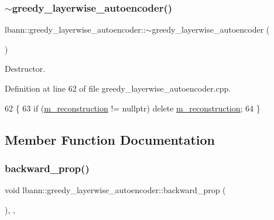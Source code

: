 \subsubsection{\texorpdfstring{$\sim$greedy\+\_\+layerwise\+\_\+autoencoder()}{~greedy\_layerwise\_autoencoder()}}
{\footnotesize\ttfamily lbann\+::greedy\+\_\+layerwise\+\_\+autoencoder\+::$\sim$greedy\+\_\+layerwise\+\_\+autoencoder (\begin{DoxyParamCaption}{ }\end{DoxyParamCaption})\hspace{0.3cm}{\ttfamily [override]}}

Destructor. 

Definition at line 62 of file greedy\+\_\+layerwise\+\_\+autoencoder.\+cpp.


\begin{DoxyCode}
62                                                             \{
63   \textcolor{keywordflow}{if} (\hyperlink{classlbann_1_1greedy__layerwise__autoencoder_a8238d2e3e723543c8b6f7f5c61a9ca06}{m\_reconstruction} != \textcolor{keyword}{nullptr}) \textcolor{keyword}{delete} \hyperlink{classlbann_1_1greedy__layerwise__autoencoder_a8238d2e3e723543c8b6f7f5c61a9ca06}{m\_reconstruction};
64 \}
\end{DoxyCode}


\subsection{Member Function Documentation}
\mbox{\label{classlbann_1_1greedy__layerwise__autoencoder_a6d39fda041fe570a668cb72594508062}} 
\subsubsection{\texorpdfstring{backward\+\_\+prop()}{backward\_prop()}}
{\footnotesize\ttfamily void lbann\+::greedy\+\_\+layerwise\+\_\+autoencoder\+::backward\+\_\+prop (\begin{DoxyParamCaption}{ }\end{DoxyParamCaption})\hspace{0.3cm}{\ttfamily [override]}, {\ttfamily [protected]}, {\ttfamily [virtual]}}


